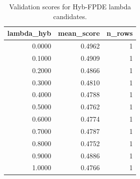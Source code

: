 \begin{table}[t]
\caption{Validation scores for Hyb-FPDE lambda candidates.}
\label{tab:lambda_distribution_computed}
\centering
\begin{tabular}{rrr}
\toprule
lambda\_hyb & mean\_score & n\_rows \\
\midrule
0.0000 & 0.4962 & 1 \\
0.1000 & 0.4909 & 1 \\
0.2000 & 0.4866 & 1 \\
0.3000 & 0.4810 & 1 \\
0.4000 & 0.4788 & 1 \\
0.5000 & 0.4762 & 1 \\
0.6000 & 0.4774 & 1 \\
0.7000 & 0.4787 & 1 \\
0.8000 & 0.4752 & 1 \\
0.9000 & 0.4886 & 1 \\
1.0000 & 0.4766 & 1 \\
\bottomrule
\end{tabular}

\end{table}

